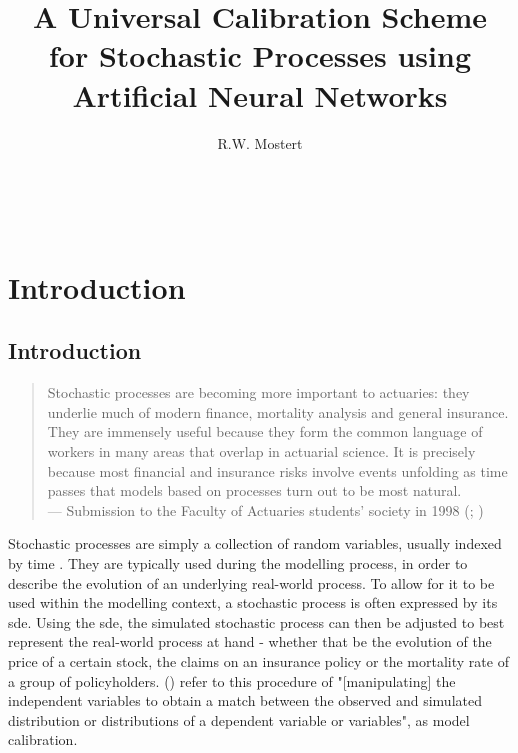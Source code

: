 \documentclass[11pt,oneside,openany,a4paper,english, report, goldenblock
]{usthesis}
\title{A Universal Calibration Scheme for Stochastic Processes using Artificial Neural Networks}
\author{R.W. Mostert}{Rayno Willem Mostert}
\begin{document}
	
	\TitlePage%
	
	\DeclarationPage
	

\
\begin{abstract}
	
\end{abstract}

\tableofcontents

\listoffigures

\listoftables

\printglossary[type=\acronymtype, title=List of abbreviations and/or acronyms, toctitle=List of abbreviations]
	
\chapter{Introduction} 
\label{chapter:introduction}

\section{Introduction}

\begin{quote}
	Stochastic processes are becoming more important to actuaries: they underlie much of modern finance, mortality analysis and general insurance. They are immensely useful because they form the common language of workers in many areas that overlap in actuarial science.  It is precisely because most financial and insurance risks involve events unfolding as time passes that models based on processes turn out to be most natural.
	\\ --- Submission to the Faculty of Actuaries students' society in 1998 (\citefullauthor{cairns1998stochastic}; \citeyear{cairns1998stochastic})
\end{quote}

Stochastic processes are simply a collection of random variables, usually indexed by time \citep{Barone-Adesi}. They are typically used during the modelling process, in order to describe the evolution of an underlying real-world process. To allow for it to be used within the modelling context, a stochastic process is often expressed by its \acrfull{sde}. 
Using the \acrshort{sde}, the simulated stochastic process can then be adjusted to best represent the real-world process at hand - whether that be the evolution of the price of a certain stock, the claims on an insurance policy or the mortality rate of a group of policyholders. 
\citefullauthor{Oreskes} (\citeyear{Oreskes}) refer to this procedure of "[manipulating] the independent variables to obtain a match between the observed and simulated distribution or distributions of a dependent variable or variables", as model calibration.
\end{document}
